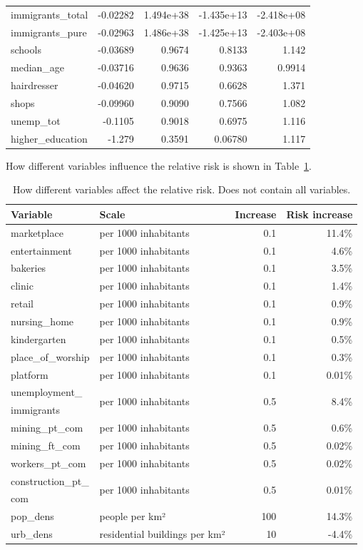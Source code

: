 \begin{table}[H]
\begin{tabular}{l r r r r}
immigrants\_total & -0.02282 & 1.494e+38 & -1.435e+13 & -2.418e+08\\
immigrants\_pure & -0.02963 & 1.486e+38 & -1.425e+13 & -2.403e+08\\
schools & -0.03689 & 0.9674 & 0.8133 & 1.142 \\
median\_age & -0.03716 & 0.9636 & 0.9363 & 0.9914 \\
hairdresser & -0.04620 & 0.9715 & 0.6628 & 1.371 \\
shops & -0.09960 & 0.9090 & 0.7566 & 1.082 \\
unemp\_tot & -0.1105 & 0.9018 & 0.6975 & 1.116 \\
higher\_education & -1.279 & 0.3591 & 0.06780 & 1.117 \\
\bottomrule
\end{tabular}
\end{table}
How different variables influence the relative risk is shown in Table~\ref{riskTableNorway}.
\begin{table}[H]
\caption{How different variables affect the relative risk. Does not contain all variables.\label{riskTableNorway}}
\begin{tabular}{l l r r}
\toprule
\textbf{Variable} & \textbf{Scale} & \textbf{Increase} & \textbf{Risk increase} \\
\midrule
marketplace & per 1000 inhabitants & 0.1 & 11.4\% \\
entertainment & per 1000 inhabitants & 0.1 & 4.6\% \\
bakeries & per 1000 inhabitants & 0.1 & 3.5\% \\
clinic & per 1000 inhabitants & 0.1 & 1.4\% \\
retail & per 1000 inhabitants & 0.1 & 0.9\% \\
nursing\_home & per 1000 inhabitants & 0.1 & 0.9\% \\
kindergarten & per 1000 inhabitants & 0.1 & 0.5\% \\
place\_of\_worship & per 1000 inhabitants & 0.1 & 0.3\% \\
platform & per 1000 inhabitants & 0.1 & 0.01\% \\
unemployment\_ & \multirow{2}{*}{per 1000 inhabitants} & \multirow{2}{*}{0.5} & \multirow{2}{*}{8.4\%}\\
immigrants \\
mining\_pt\_com & per 1000 inhabitants & 0.5 & 0.6\% \\
mining\_ft\_com & per 1000 inhabitants & 0.5 & 0.02\% \\
workers\_pt\_com & per 1000 inhabitants & 0.5 & 0.02\% \\
construction\_pt\_ & \multirow{2}{*}{per 1000 inhabitants} & \multirow{2}{*}{0.5} & \multirow{2}{*}{0.01\%}\\
com \\
pop\_dens & people per km² & 100 & 14.3\% \\
urb\_dens & residential buildings per km² & 10 & -4.4\% \\
\bottomrule
\end{tabular}
\end{table}
